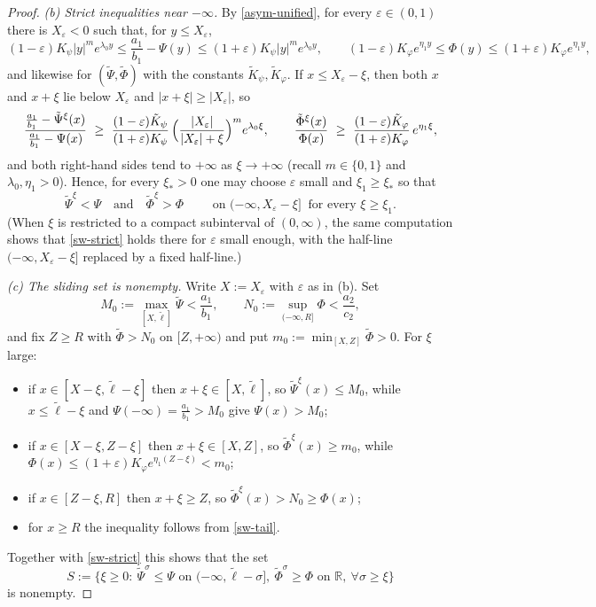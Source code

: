 \documentclass[reqno]{amsart}
\newcommand{\rev}[1]{#1}
\theoremstyle{plain}
\theoremstyle{definition}
\theoremstyle{remark}
\begin{document}
\begin{proof}
		\rev{\emph{(b) Strict inequalities near $-\infty$.} By \eqref{asym-unified},
		for every $\varepsilon\in(0,1)$ there is $X_\varepsilon<0$ such that, for
		$y\le X_\varepsilon$,
		\[
		(1-\varepsilon)K_\psi|y|^{m}e^{\lambda_0y}\le\frac{a_1}{b_1}-\Psi(y)\le(1+\varepsilon)K_\psi|y|^{m}e^{\lambda_0y},
		\qquad
		(1-\varepsilon)K_\varphi e^{\eta_1y}\le\Phi(y)\le(1+\varepsilon)K_\varphi e^{\eta_1y},
		\]
		and likewise for $(\tilde\Psi,\tilde\Phi)$ with the constants
		$\tilde K_\psi,\tilde K_\varphi$. If $x\le X_\varepsilon-\xi$, then both $x$
		and $x+\xi$ lie below $X_\varepsilon$ and $|x+\xi|\ge|X_\varepsilon|$, so
		\[
		\frac{\frac{a_1}{b_1}-\tilde\Psi^{\xi}(x)}{\frac{a_1}{b_1}-\Psi(x)}
		\ \ge\ \frac{(1-\varepsilon)\tilde K_\psi}{(1+\varepsilon)K_\psi}\,
		\Bigl(\frac{|X_\varepsilon|}{|X_\varepsilon|+\xi}\Bigr)^{m}e^{\lambda_0\xi},
		\qquad
		\frac{\tilde\Phi^{\xi}(x)}{\Phi(x)}
		\ \ge\ \frac{(1-\varepsilon)\tilde K_\varphi}{(1+\varepsilon)K_\varphi}\,e^{\eta_1\xi},
		\]
		and both right-hand sides tend to $+\infty$ as $\xi\to+\infty$ (recall
		$m\in\{0,1\}$ and $\lambda_0,\eta_1>0$). Hence, for every $\xi_*>0$ one may
		choose $\varepsilon$ small and $\xi_1\ge\xi_*$ so that
		\begin{equation}\label{sw-strict}
			\tilde\Psi^\xi<\Psi \quad\text{and}\quad \tilde\Phi^\xi>\Phi
			\qquad\text{ on }(-\infty,X_\varepsilon-\xi]\ \text{ for every }\xi\ge\xi_1 .
		\end{equation}
		(When $\xi$ is restricted to a compact subinterval of $(0,\infty)$, the same
		computation shows that \eqref{sw-strict} holds there for $\varepsilon$ small
		enough, with the half-line $(-\infty,X_\varepsilon-\xi]$ replaced by a fixed
		half-line.)}

		\rev{\emph{(c) The sliding set is nonempty.} Write $X:=X_\varepsilon$ with
		$\varepsilon$ as in (b). Set
		\[
		M_0:=\max_{[X,\tilde\ell]}\tilde\Psi<\frac{a_1}{b_1},
		\qquad
		N_0:=\sup_{(-\infty,R]}\Phi<\frac{a_2}{c_2},
		\]
		and fix $Z\ge R$ with $\tilde\Phi>N_0$ on $[Z,+\infty)$ and put
		$m_0:=\min_{[X,Z]}\tilde\Phi>0$. For $\xi$ large:
		\begin{itemize}
			\item if $x\in[X-\xi,\tilde\ell-\xi]$ then $x+\xi\in[X,\tilde\ell]$, so
			$\tilde\Psi^{\xi}(x)\le M_0$, while $x\le\tilde\ell-\xi$ and
			$\Psi(-\infty)=\frac{a_1}{b_1}>M_0$ give $\Psi(x)>M_0$;
			\item if $x\in[X-\xi,Z-\xi]$ then $x+\xi\in[X,Z]$, so
			$\tilde\Phi^{\xi}(x)\ge m_0$, while
			$\Phi(x)\le(1+\varepsilon)K_\varphi e^{\eta_1(Z-\xi)}<m_0$;
			\item if $x\in[Z-\xi,R]$ then $x+\xi\ge Z$, so
			$\tilde\Phi^{\xi}(x)>N_0\ge\Phi(x)$;
			\item for $x\ge R$ the inequality follows from \eqref{sw-tail}.
		\end{itemize}
		Together with \eqref{sw-strict} this shows that the set
		\[
		S:=\bigl\{\xi\ge0:\ \tilde\Psi^\sigma\le\Psi \text{ on }(-\infty,\tilde\ell-\sigma],\
		\tilde\Phi^\sigma\ge\Phi \text{ on }\mathbb{R},\ \forall\sigma\ge\xi\bigr\}
		\]
		is nonempty.}


\end{proof}
\end{document}
